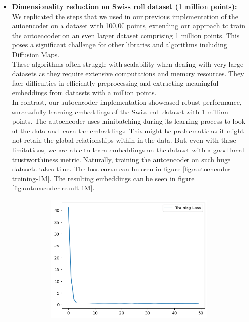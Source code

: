 \begin{itemize}
\begin{itemize}
            \item \textbf{Dimensionality reduction on Swiss roll dataset (1 million points):}\\
            We replicated the steps that we used in our previous implementation of the autoencoder on a dataset with 100,00 points, extending our approach to train the autoencoder on an even larger dataset comprising 1 million points. This poses a significant challenge for other libraries and algorithms including Diffusion Maps. \\
            These algorithms often struggle with scalability when dealing with very large datasets as they require extensive computations and memory resources. They face difficulties in efficiently preprocessing and extracting meaningful embeddings from datasets with a million points.\\
            In contrast, our autoencoder implementation showcased robust performance, successfully learning embeddings of the Swiss roll dataset with 1 million points. The autoencoder uses minibatching during its learning process to look at the data and learn the embeddings.  This might be problematic as it might not retain the global relationships within in the data. But, even with these limitations, we are able to learn embeddings on the dataset with a good local trustworthiness metric. Naturally, training the autoencoder on such huge datasets takes time. The loss curve can be seen in figure \ref{fig:autoencoder-training-1M}. The resulting embeddings can be seen in figure \ref{fig:autoencoder-result-1M}.
            \begin{figure}[H]
	      	\centering
	      	\begin{subfigure}{0.45\textwidth}
	      		\includegraphics[width=\linewidth]{images/autoencoder_training_1M.png}

\end{subfigure}
\end{figure}
\end{itemize}
\end{itemize}
